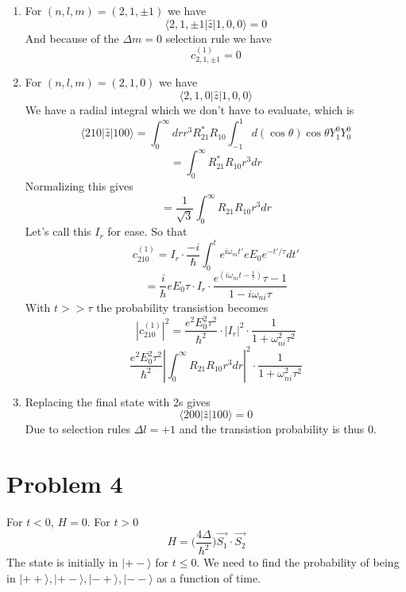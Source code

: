 \documentclass[12pt]{article}
\newcommand{\ket}[1]{\vert{#1}\rangle}
\begin{document}
\begin{enumerate}
    \item For $(n,l,m) = (2,1,\pm 1) $ we have 
    $$ \langle 2,1, \pm 1 | \hat{z} | 1,0,0 \rangle =0 $$
    And because of the $ \Delta m = 0$ selection rule we have 
    $$ c_{2,1, \pm 1}^{(1)} = 0 $$ 
    
    \item For $(n,l,m) = (2,1,0) $ we have 
    $$ \langle 2,1,0 | \hat{z} | 1,0,0 \rangle $$
    We have a radial integral which we don't have to evaluate, which is 
    $$ \langle 210 | \hat{z} | 100 \rangle = \int_0^{\infty} dr r^3 R_{21}^* R_{10} \int_{-1}^1 d (\cos \theta ) \cos \theta Y_1^0 Y_0^0 $$
    $$ = \int_0^{\infty} R_{21}^* R_{10} r^3 dr $$
    Normalizing this gives 
    $$ = \frac{1}{\sqrt{3}} \int_0^{\infty} R_{21} R_{10} r^3 dr $$
    Let's call this $I_r$ for ease. So that 
    $$ c_{210}^{(1)} = I_r \cdot \frac{-i}{\hbar} \int_0^t e^{i \omega_{ni} t'} e E_0 e^{-t' / \tau } dt' $$
    $$ = \frac{i}{\hbar} e E_0 \tau \cdot I_r \cdot \frac{e^(i \omega_{ni} t - \frac{1}{\tau} ) \tau -1}{1- i \omega_{ni} \tau } $$ 
    With $ t >> \tau $ the probability transistion becomes 
    $$ | c_{210}^{(1)} |^2 = \frac{e^2 E_0^2 \tau^2}{\hbar^2} \cdot | I_r |^2 \cdot \frac{1}{1 + \omega_{ni}^2 \tau^2 } $$
    $$ \frac{e^2 E_0^2 \tau^2}{\hbar^2} | \int_0^{\infty} R_{21} R_{10} r^3 dr |^2 \cdot \frac{1}{1+ \omega_{ni}^2 \tau^2} $$

    \item Replacing the final state with 2s gives 
    $$ \langle 200 | \hat{z} | 100 \rangle = 0 $$
    Due to selection rules $\Delta l = + 1$ and the transistion probability is thus 0. 

    


\end{enumerate}

\section*{Problem 4} 
For $t <0$, $H=0$. For $t > 0$ 
$$ H = \Big( \frac{4 \Delta}{\hbar^2} \Big) \vec{S_1} \cdot \vec{S_2} $$
The state is initially in $\ket{ + - }$ for $ t \leq 0$. We need to find the probability of being in $\ket{++}, \ket{+-}, \ket{-+}, \ket{--}$ as a function of time. 
\end{document}
